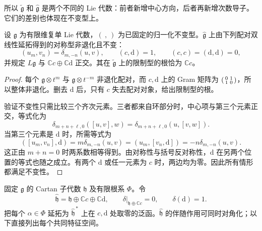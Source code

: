 所以 \(\widetilde{\mathfrak g}\) 和 \(\widehat{\mathfrak g}\) 是两个不同的 Lie 代数：前者新增中心方向，后者再新增次数导子。它们的差别也体现在不变型上。

\begin{proposition}\label{b5:prop:G-affine-invariant-form}
	设 \(\mathfrak g\) 为有限维复单 Lie 代数，\((\ ,\ )\) 为已固定的归一化不变型。\(\widehat{\mathfrak g}\) 上由下列配对双线性延拓得到的对称型非退化且不变：
	\[
		(u_m,v_n)=\delta_{m,-n}(u,v),\qquad
		(c,\mathrm d)=1,\qquad(c,c)=(\mathrm d,\mathrm d)=0,
	\]
	并规定 \(L\mathfrak g\) 与 \(\mathbb Cc\oplus\mathbb C\mathrm d\) 正交。其在 \(\widetilde{\mathfrak g}\) 上的限制型的根恰为 \(\mathbb Cc\)。
\end{proposition}
\begin{proof}
	每个 \(\mathfrak g\otimes t^m\) 与 \(\mathfrak g\otimes t^{-m}\) 非退化配对，而 \(c,\mathrm d\) 上的 Gram 矩阵为 \(\begin{psmallmatrix}0&1\\1&0\end{psmallmatrix}\)，所以整体非退化。删去 \(\mathrm d\) 后，只有 \(c\) 失去配对对象，给出限制型的根。

	验证不变性只需比较三个齐次元素。三者都来自环部分时，中心项与第三个元素正交，等式化为
	\[
		\delta_{m+n+\ell,0}([u,v],w)
		=\delta_{m+n+\ell,0}(u,[v,w]).
	\]
	当第三个元素是 \(\mathrm d\) 时，所需等式为
	\[
		([u_m,v_n],\mathrm d)=m\delta_{m,-n}(u,v)
		=(u_m,[v_n,\mathrm d])=-n\delta_{m,-n}(u,v).
	\]
	这正由 \(m+n=0\) 时两系数相等得到。由对称性与括号反对称性，\(\mathrm d\) 在另两个位置的等式也随之成立。有两个 \(\mathrm d\) 或任一元素为 \(c\) 时，两边均为零。因此所有情形都满足不变性。
\end{proof}

固定 \(\mathfrak g\) 的 Cartan 子代数 \(\mathfrak h\) 及有限根系 \(\Phi\)。令
\[
	\widehat{\mathfrak h}=\mathfrak h\oplus\mathbb Cc\oplus\mathbb C\mathrm d,
	\qquad
	\delta|_{\mathfrak h\oplus\mathbb Cc}=0,\qquad\delta(\mathrm d)=1.
\]
把每个 \(\alpha\in\Phi\) 延拓为 \(\widehat{\mathfrak h}^{\,*}\) 上在 \(c,\mathrm d\) 处取零的泛函。\(\widehat{\mathfrak h}\) 的伴随作用可同时对角化；以下直接列出每个共同特征空间。

